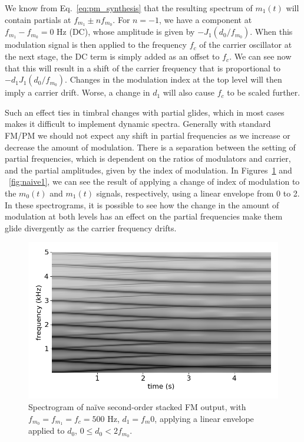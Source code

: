 \documentclass[]{interact}
\begin{document}
We know from Eq.~\ref{eq:pm_synthesis} that the resulting spectrum of $m_1(t)$
will contain partials at $f_{m_1} \pm nf_{m_0}$. For $n = -1$, we have a component
at $f_{m_1} - f_{m_0} = 0$ Hz (DC), whose amplitude is given by $-J_{1}\left(d_0/f_{m_0}\right)$. When this modulation signal is then applied to the frequency $f_c$ of the carrier oscillator at the next stage, the DC term is simply added as an offset to $f_c$. We can see now that this will result in a shift of the carrier frequency that is proportional to $-d_1J_{1}(d_0/f_{m_0})$. Changes in the modulation index at the top level will then imply a carrier drift. Worse, a change in $d_1$ will also cause $f_c$ to be scaled further.

Such an effect ties in timbral changes with partial glides, which in most cases makes it difficult to implement dynamic spectra. Generally with standard FM/PM we should not expect any shift in partial frequencies as we increase or decrease the amount of modulation. There is a separation between the setting of partial frequencies, which is dependent on the ratios of modulators and carrier, and the partial
amplitudes, given by the index of modulation. In Figures~\ref{fig:naive0} and ~\ref{fig:naive1}, we can see the result of applying a change of index of modulation to the $m_0(t)$ and $m_1(t)$ signals, respectively, using a linear envelope from 0 to 2. In these spectrograms, it is possible to see how the change in the amount of modulation at both levels has an effect on the partial frequencies make them glide divergently as the carrier frequency drifts.

\begin{figure}[htp]
\begin{center}
\includegraphics[width=0.9\columnwidth]{naive0.png}
\caption{Spectrogram of na\"{i}ve second-order stacked FM output, with $f_{m_0} = f_{m_1} = f_c = 500$ Hz, $d_1 = f_m0$, applying a linear envelope applied to $d_0$, $0 \leq d_0 < 2f_{m_0}$.}
\label{fig:naive0}
\end{center}
\end{figure} 
\end{document}
